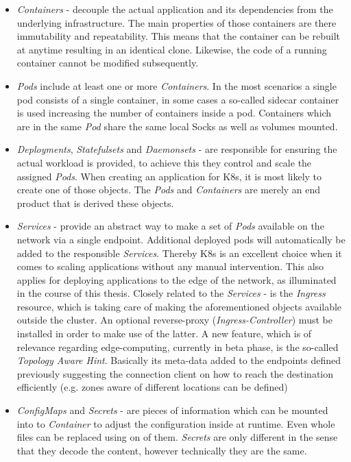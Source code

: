 \documentclass[MSC,Master,english]{twbook}%
\begin{document}
\begin{itemize}
    \item \textit{Containers} - decouple the actual application and its dependencies from the underlying infrastructure. The main properties of those containers are there immutability and repeatability. This means that the container can be rebuilt at anytime resulting in an identical clone. Likewise, the code of a running container cannot be modified subsequently.
    \item \textit{Pods} include at least one or more \textit{Containers}. In the most scenarios a single pod consists of a single container, in some cases a so-called sidecar container is used increasing the number of containers inside a pod. Containers which are in the same \textit{Pod} share the same local Socks as well as volumes mounted.
    \item \textit{Deployments}, \textit{Statefulsets} and \textit{Daemonsets} - are responsible for ensuring the actual workload is provided, to achieve this they control and scale the assigned \textit{Pods}. When creating an application for \ac{K8s}, it is most likely to create one of those objects. The \textit{Pods} and \textit{Containers} are merely an end product that is derived these objects.
    \item \textit{Services} - provide an abstract way to make a set of \textit{Pods} available on the network via a single endpoint. Additional deployed pods will automatically be added to the responsible \textit{Services}. Thereby \ac{K8s} is an excellent choice when it comes to scaling applications without any manual intervention. This also applies for deploying applications to the edge of the network, as illuminated in the course of this thesis. Closely related to the \textit{Services} - is the \textit{Ingress} resource, which is taking care of making the aforementioned objects available outside the cluster. An optional reverse-proxy (\textit{Ingress-Controller}) must be installed in order to make use of the latter. \newline
    A new feature, which is of relevance regarding edge-computing, currently in beta phase, is the so-called \textit{Topology Aware Hint}. Basically its meta-data added to the endpoints defined previously suggesting the connection client on how to reach the destination efficiently (e.g. zones aware of different locations can be defined)
    \item \textit{ConfigMaps} and \textit{Secrets} - are pieces of information which can be mounted into to \textit{Container} to adjust the configuration inside at runtime. Even whole files can be replaced using on of them. \textit{Secrets} are only different in the sense that they decode the content, however technically they are the same.

\end{itemize}
\end{document}

